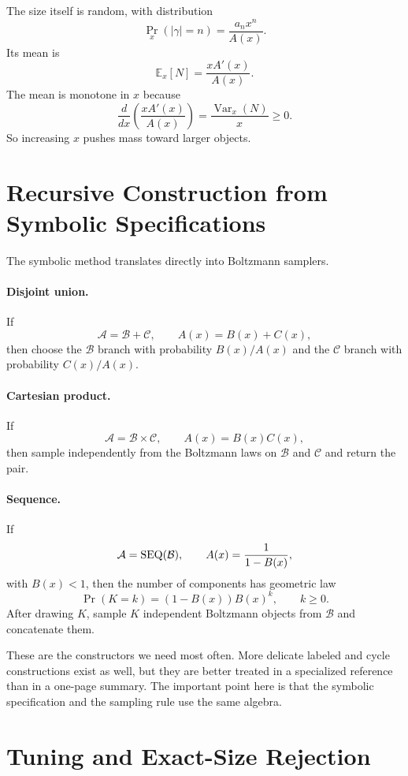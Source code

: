 The size itself is random, with distribution
\[
  \Pr_x(|\gamma|=n)=\frac{a_n x^n}{A(x)}.
\]
Its mean is
\[
  \mathbb E_x[N] = \frac{xA'(x)}{A(x)}.
\]
The mean is monotone in $x$ because
\[
  \frac{d}{dx}\left(\frac{xA'(x)}{A(x)}\right) = \frac{\operatorname{Var}_x(N)}{x} \ge 0.
\]
So increasing $x$ pushes mass toward larger objects.

\section{Recursive Construction from Symbolic Specifications}

The symbolic method translates directly into Boltzmann samplers.

\paragraph{Disjoint union.}
If
\[
  \mathcal{A} = \mathcal{B} + \mathcal{C},
  \qquad A(x)=B(x)+C(x),
\]
then choose the $\mathcal B$ branch with probability $B(x)/A(x)$ and the $\mathcal C$ branch with probability $C(x)/A(x)$.

\paragraph{Cartesian product.}
If
\[
  \mathcal{A} = \mathcal{B} \times \mathcal{C},
  \qquad A(x)=B(x)C(x),
\]
then sample independently from the Boltzmann laws on $\mathcal B$ and $\mathcal C$ and return the pair.

\paragraph{Sequence.}
If
\[
  \mathcal{A} = \operatorname{SEQ}(\mathcal{B}),
  \qquad A(x)=\frac{1}{1-B(x)},
\]
with $B(x)<1$, then the number of components has geometric law
\[
  \Pr(K=k) = (1-B(x))B(x)^k,
  \qquad k \ge 0.
\]
After drawing $K$, sample $K$ independent Boltzmann objects from $\mathcal B$ and concatenate them.

These are the constructors we need most often. More delicate labeled and cycle constructions exist as well, but they are better treated in a specialized reference than in a one-page summary. The important point here is that the symbolic specification and the sampling rule use the same algebra.

\section{Tuning and Exact-Size Rejection}

